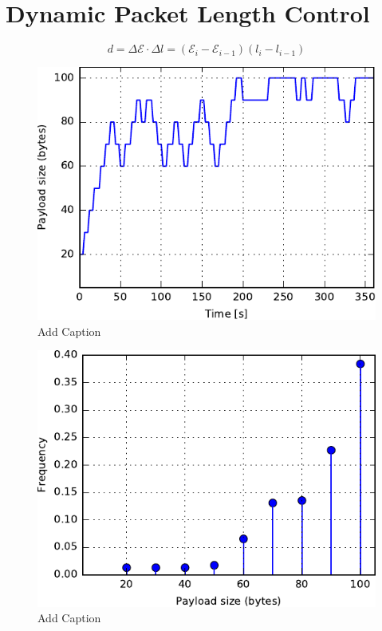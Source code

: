 \section{Dynamic Packet Length Control}

\begin{equation}
d = \Delta \mathcal{E}\cdot\Delta l= (\mathcal{E}_i - \mathcal{E}_{i-1})(l_i - l_{i-1})
\end{equation}


\begin{figure}
\centering
\includegraphics[scale=1]{figs/35mDPLC.pdf} 
\caption{Add Caption}
\end{figure}
\begin{figure}
\centering
\includegraphics[scale=1]{figs/35mHist.pdf} 
\caption{Add Caption}
\end{figure}
